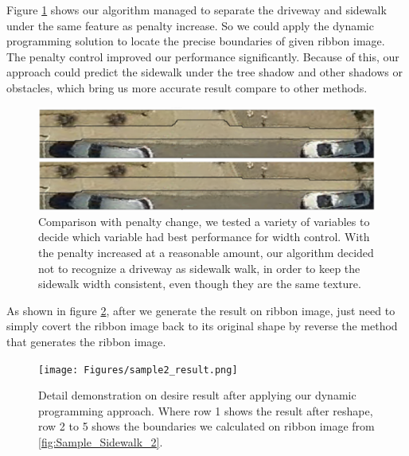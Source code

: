 Figure \ref{fig:penalty} shows our algorithm managed to separate the driveway and sidewalk under the same feature as penalty increase. So we could apply the dynamic programming solution to locate the precise boundaries of given ribbon image. The penalty control improved our performance significantly. Because of this, our approach could predict the sidewalk under the tree shadow and other shadows or obstacles, which bring us more accurate result compare to other methods.
\begin{figure}[H]
    \centering
    \includegraphics[width=\textwidth]{Figures/penalty.png}
    \caption[Penalty Process]{Comparison with penalty change, we tested a variety of variables to decide which variable had best performance for width control. With the penalty increased at a reasonable amount, our algorithm decided not to recognize a driveway as sidewalk walk, in order to keep the sidewalk width consistent, even though they are the same texture.}
    \label{fig:penalty}
\end{figure}

As shown in figure \ref{fig:sample_result2}, after we generate the result on ribbon image, just need to simply covert the ribbon image back to its original shape by reverse the method that generates the ribbon image. 

\begin{figure}[H]
    \centering
    \texttt{[image: Figures/sample2\_result.png]}
    \caption[Desire Output on Sample Sidewalk]{Detail demonstration on desire result after applying our dynamic programming approach. Where row 1 shows the result after reshape, row 2 to 5 shows the boundaries we calculated on ribbon image from \ref{fig:Sample_Sidewalk_2}.}
    \label{fig:sample_result2}
\end{figure}